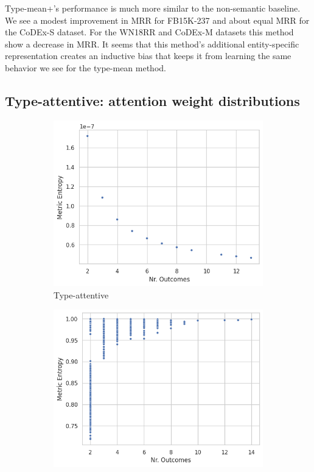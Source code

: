 Type-mean+'s performance is much more similar to the non-semantic baseline.
We see a modest improvement in MRR for FB15K-237 and about equal MRR for the CoDEx-S dataset.
For the WN18RR and CoDEx-M datasets this method show a decrease in MRR. 
It seems that this method's additional entity-specific representation creates an inductive bias that keeps it from learning the same behavior we see for the type-mean method.


\subsection{Type-attentive: attention weight distributions}
\label{sec:experiments:type_attentive}
\begin{figure}
    \centering
    \caption[Scatter plot of metric entropy for CoDEx-S.]{Scatter plot of metric entropy over the number of outcomes for the CoDEx-S dataset.}
    \begin{subfigure}[b]{0.486\columnwidth}
        \includegraphics{figures/analysis/codex-s_scatter_nr_types_vs_metric_entropy.png}
        \caption{Type-attentive}
    \end{subfigure}
    \begin{subfigure}[b]{0.489\columnwidth}
        \includegraphics{figures/analysis/codex-s_alt_scatter_nr_types_vs_metric_entropy.png}

\end{subfigure}
\end{figure}
